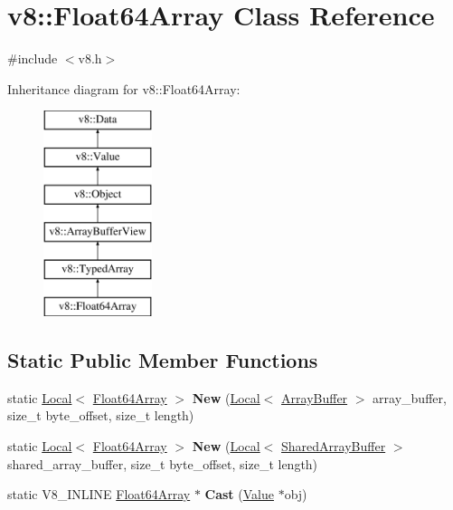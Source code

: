 \hypertarget{classv8_1_1_float64_array}{}\section{v8\+:\+:Float64\+Array Class Reference}
\label{classv8_1_1_float64_array}


{\ttfamily \#include $<$v8.\+h$>$}

Inheritance diagram for v8\+:\+:Float64\+Array\+:\begin{figure}[H]
\begin{center}
\leavevmode
\includegraphics[height=6.000000cm]{classv8_1_1_float64_array}
\end{center}
\end{figure}
\subsection*{Static Public Member Functions}
\begin{DoxyCompactItemize}
\item 
static \hyperlink{classv8_1_1_local}{Local}$<$ \hyperlink{classv8_1_1_float64_array}{Float64\+Array} $>$ {\bfseries New} (\hyperlink{classv8_1_1_local}{Local}$<$ \hyperlink{classv8_1_1_array_buffer}{Array\+Buffer} $>$ array\+\_\+buffer, size\+\_\+t byte\+\_\+offset, size\+\_\+t length)\hypertarget{classv8_1_1_float64_array_a6e12e5ced578a357cfd049e036c4d6d6}{}\label{classv8_1_1_float64_array_a6e12e5ced578a357cfd049e036c4d6d6}

\item 
static \hyperlink{classv8_1_1_local}{Local}$<$ \hyperlink{classv8_1_1_float64_array}{Float64\+Array} $>$ {\bfseries New} (\hyperlink{classv8_1_1_local}{Local}$<$ \hyperlink{classv8_1_1_shared_array_buffer}{Shared\+Array\+Buffer} $>$ shared\+\_\+array\+\_\+buffer, size\+\_\+t byte\+\_\+offset, size\+\_\+t length)\hypertarget{classv8_1_1_float64_array_aff414a8613e468f7deb29996f049e130}{}\label{classv8_1_1_float64_array_aff414a8613e468f7deb29996f049e130}

\item 
static V8\+\_\+\+I\+N\+L\+I\+NE \hyperlink{classv8_1_1_float64_array}{Float64\+Array} $\ast$ {\bfseries Cast} (\hyperlink{classv8_1_1_value}{Value} $\ast$obj)\hypertarget{classv8_1_1_float64_array_a936ee8e8cb2cb892cc5369e3ee6a7784}{}\label{classv8_1_1_float64_array_a936ee8e8cb2cb892cc5369e3ee6a7784}

\end{DoxyCompactItemize}
